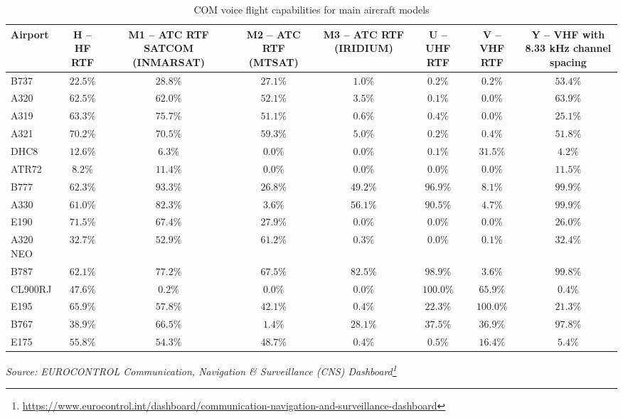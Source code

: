 \documentclass[
  11pt,
  a4paper,
]{book}
\DeclareRobustCommand{\href}[2]{#2\footnote{\url{#1}}}
\begin{document}
\hypertarget{tbl-com-voice-aircraft}{}
\setlength{\LTpost}{0mm}
\begin{longtable}{lccccccc}
\caption{\label{tbl-com-voice-aircraft}COM voice flight capabilities for main aircraft models }\tabularnewline

\toprule
Airport & H – HF RTF & M1 – ATC RTF SATCOM (INMARSAT) & M2 – ATC RTF (MTSAT) & M3 – ATC RTF (IRIDIUM) & U – UHF RTF & V – VHF RTF & Y – VHF with 8.33 kHz channel spacing \\ 
\midrule
B737 & $22.5\%$ & $28.8\%$ & $27.1\%$ & $1.0\%$ & $0.2\%$ & $0.2\%$ & $53.4\%$ \\ 
A320 & $62.5\%$ & $62.0\%$ & $52.1\%$ & $3.5\%$ & $0.1\%$ & $0.0\%$ & $63.9\%$ \\ 
A319 & $63.3\%$ & $75.7\%$ & $51.1\%$ & $0.6\%$ & $0.4\%$ & $0.0\%$ & $25.1\%$ \\ 
A321 & $70.2\%$ & $70.5\%$ & $59.3\%$ & $5.0\%$ & $0.2\%$ & $0.4\%$ & $51.8\%$ \\ 
DHC8 & $12.6\%$ & $6.3\%$ & $0.0\%$ & $0.0\%$ & $0.1\%$ & $31.5\%$ & $4.2\%$ \\ 
ATR72 & $8.2\%$ & $11.4\%$ & $0.0\%$ & $0.0\%$ & $0.0\%$ & $0.0\%$ & $11.5\%$ \\ 
B777 & $62.3\%$ & $93.3\%$ & $26.8\%$ & $49.2\%$ & $96.9\%$ & $8.1\%$ & $99.9\%$ \\ 
A330 & $61.0\%$ & $82.3\%$ & $3.6\%$ & $56.1\%$ & $90.5\%$ & $4.7\%$ & $99.9\%$ \\ 
E190 & $71.5\%$ & $67.4\%$ & $27.9\%$ & $0.0\%$ & $0.0\%$ & $0.0\%$ & $26.0\%$ \\ 
A320 NEO & $32.7\%$ & $52.9\%$ & $61.2\%$ & $0.3\%$ & $0.0\%$ & $0.1\%$ & $32.4\%$ \\ 
B787 & $62.1\%$ & $77.2\%$ & $67.5\%$ & $82.5\%$ & $98.9\%$ & $3.6\%$ & $99.8\%$ \\ 
CL900RJ & $47.6\%$ & $0.2\%$ & $0.0\%$ & $0.0\%$ & $100.0\%$ & $65.9\%$ & $0.4\%$ \\ 
E195 & $65.9\%$ & $57.8\%$ & $42.1\%$ & $0.4\%$ & $22.3\%$ & $100.0\%$ & $21.3\%$ \\ 
B767 & $38.9\%$ & $66.5\%$ & $1.4\%$ & $28.1\%$ & $37.5\%$ & $36.9\%$ & $97.8\%$ \\ 
E175 & $55.8\%$ & $54.3\%$ & $48.7\%$ & $0.4\%$ & $0.5\%$ & $16.4\%$ & $5.4\%$ \\ 
\bottomrule
\end{longtable}
\begin{minipage}{\linewidth}
\emph{Source: \href{https://www.eurocontrol.int/dashboard/communication-navigation-and-surveillance-dashboard}{EUROCONTROL Communication, Navigation \& Surveillance (CNS) Dashboard}}\\
\end{minipage}
\end{document}
